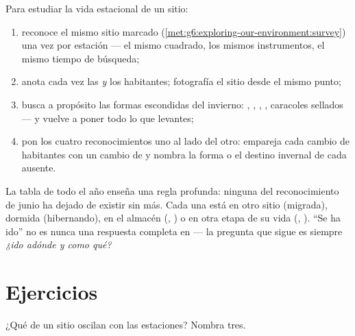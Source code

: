 \begin{method}\label{met:g6:life-through-seasons:yearsurvey}
Para estudiar la vida estacional de un sitio:
\begin{enumerate}
  \item reconoce el mismo sitio marcado
        (\cref{met:g6:exploring-our-environment:survey}) una vez por
        estación --- el mismo cuadrado, los mismos instrumentos, el
        mismo tiempo de búsqueda;
  \item anota cada vez las  \emph{y} los habitantes;
        fotografía el sitio desde el mismo punto;
  \item busca a propósito las formas escondidas del invierno: ,
        , , , caracoles sellados --- y vuelve a
        poner todo lo que levantes;
  \item pon los cuatro reconocimientos uno al lado del otro: empareja
        cada cambio de habitantes con un cambio de  y
        nombra la forma o el destino invernal de cada ausente.
\end{enumerate}
\end{method}

\begin{remark}\label{rem:g6:life-through-seasons:vanish}
La tabla de todo el año enseña una regla profunda: ninguna  del
reconocimiento de junio ha dejado de existir sin más. Cada una está en
otro sitio (migrada), dormida (hibernando), en el almacén (,
) o en otra etapa de su vida (, ). ``Se ha ido''
no es nunca una respuesta completa en  --- la pregunta que
sigue es siempre \emph{¿ido adónde y como qué?}
\end{remark}

\section{Ejercicios}

\begin{exercise}[$\star$]\label{exo:g6:life-through-seasons:1}
¿Qué  de un sitio oscilan con las estaciones? Nombra tres.
\end{exercise}

